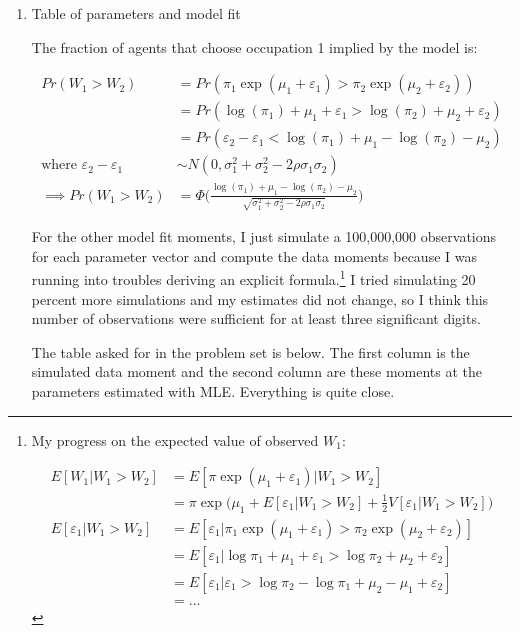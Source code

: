 \documentclass{article}
\begin{document}
\begin{enumerate}
\begin{enumerate}
\bigskip

\item Table of parameters and model fit

\bigskip

The fraction of agents that choose occupation 1 implied by the model is:

\begin{align*}
Pr(W_1 > W_2)
&= Pr(\pi_1 \exp(\mu_1 + \varepsilon_1) > \pi_2 \exp(\mu_2 + \varepsilon_2)) \\
&= Pr(\log(\pi_1) +\mu_1 + \varepsilon_1 > \log(\pi_2) + \mu_2 + \varepsilon_2) \\
&= Pr( \varepsilon_2 - \varepsilon_1 < \log(\pi_1) + \mu_1 - \log(\pi_2) - \mu_2) \\
\text{where } 
\varepsilon_2 - \varepsilon_1 &\sim N(0, \sigma_1^2 + \sigma_2^2 - 2 \rho \sigma_1 \sigma_2)\\
\implies
Pr(W_1 > W_2) &= \Phi\Bigg(\frac{\log(\pi_1) + \mu_1 - \log(\pi_2) - \mu_2}{\sqrt{\sigma_1^2 + \sigma_2^2 - 2 \rho \sigma_1 \sigma_2}}\Bigg)
\end{align*}

For the other model fit moments, I just simulate a 100,000,000 observations for each parameter vector and compute the data moments because I was running into troubles deriving an explicit formula.\footnote{ My progress on the expected value of observed $W_1$:

\begin{align*}
E[W_1 | W_1 > W_2]
&= 
E[\pi \exp(\mu_1 + \varepsilon_1) | W_1 > W_2] \\
&= 
\pi \exp \Big(\mu_1 + E[\varepsilon_1 | W_1 > W_2] + \frac{1}{2} V[\varepsilon_1 | W_1 > W_2]\Big) \\
E[\varepsilon_1 | W_1 > W_2] 
&= 
E[\varepsilon_1 | \pi_1 \exp( \mu_1 + \varepsilon_1) > \pi_2 \exp( \mu_2 + \varepsilon_2)] \\
&= 
E[\varepsilon_1 | \log \pi_1 + \mu_1 + \varepsilon_1 > \log \pi_2 + \mu_2 + \varepsilon_2] \\ 
&= 
E[\varepsilon_1 |  \varepsilon_1 > \log \pi_2 - \log \pi_1 + \mu_2 - \mu_1 + \varepsilon_2] \\
&= ... 
\end{align*}

} I tried simulating 20 percent more simulations and my estimates did not change, so I think this number of observations were sufficient for at least three significant digits.  

\bigskip

The table asked for in the problem set is below.  The first column is the simulated data moment and the second column are these moments at the parameters estimated with MLE.  Everything is quite close.


\end{enumerate}
\end{enumerate}
\end{document}
